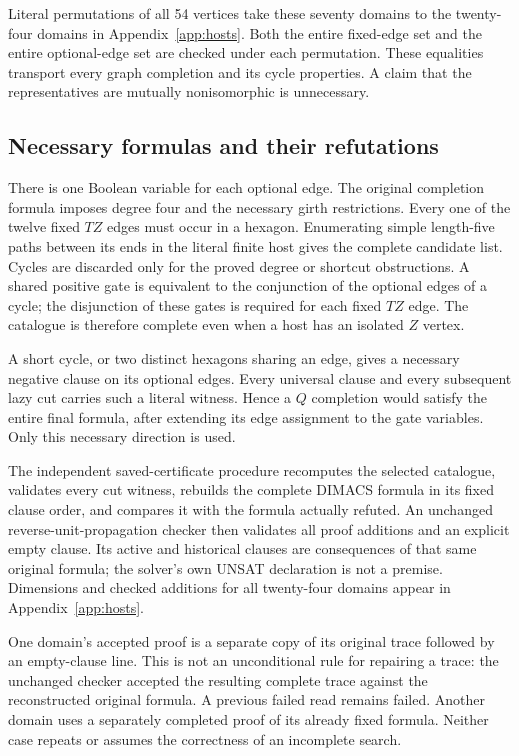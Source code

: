 \documentclass[11pt,a4paper]{article}
\begin{document}
Literal permutations of all 54 vertices take these seventy domains to
the twenty-four domains in Appendix~\ref{app:hosts}. Both the entire
fixed-edge set and the entire optional-edge set are checked under each
permutation. These equalities transport every graph completion and its
cycle properties. A claim that the representatives are mutually
nonisomorphic is unnecessary.

\subsection{Necessary formulas and their refutations}
There is one Boolean variable for each optional edge. The original
completion formula imposes degree four and the necessary girth
restrictions. Every one of the twelve fixed $TZ$ edges must occur in
a hexagon. Enumerating simple length-five paths between its ends in the
literal finite host gives the complete candidate list. Cycles are
discarded only for the proved degree or shortcut obstructions. A shared
positive gate is equivalent to the conjunction of the optional edges
of a cycle; the disjunction of these gates is required for each fixed
$TZ$ edge. The catalogue is therefore complete even when a host has an
isolated $Z$ vertex.

A short cycle, or two distinct hexagons sharing an edge, gives a
necessary negative clause on its optional edges. Every universal clause
and every subsequent lazy cut carries such a literal witness. Hence a
$Q$ completion would satisfy the entire final formula, after extending
its edge assignment to the gate variables. Only this necessary direction
is used.

The independent saved-certificate procedure recomputes the selected
catalogue, validates every cut witness, rebuilds the complete DIMACS
formula in its fixed clause order, and compares it with the formula
actually refuted. An unchanged reverse-unit-propagation checker then
validates all proof additions and an explicit empty clause. Its active
and historical clauses are consequences of that same original formula;
the solver's own UNSAT declaration is not a premise. Dimensions and
checked additions for all twenty-four domains appear in
Appendix~\ref{app:hosts}.

One domain's accepted proof is a separate copy of its original trace
followed by an empty-clause line. This is not an unconditional rule for
repairing a trace: the unchanged checker accepted the resulting complete
trace against the reconstructed original formula. A previous failed
read remains failed. Another domain uses a separately completed proof
of its already fixed formula. Neither case repeats or assumes the
correctness of an incomplete search.
\end{document}

